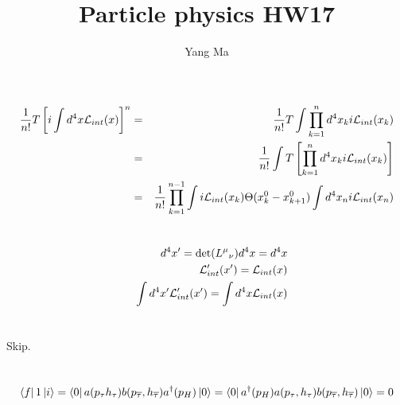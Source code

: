 \documentclass[11pt]{article}
\begin{document}
\title{Particle physics HW17}
\author{Yang Ma}

\maketitle

\section{ }
\begin{eqnarray}
    \frac{1}{n!}T\left[i\int d^4x {\cal L}_{int}(x)\right]^n & = &
    \frac{1}{n!} T \int \prod_{k=1}^n d^4x_k i {\cal L}_{int}(x_k)\\
    & =&\frac{1}{n!} \int T \left[\prod_{k=1}^{n}d^4x_k i{\cal L}_{int}(x_k)\right]\\
    & = &\frac{1}{n!}\prod_{k=1}^{n-1} \int i\mathcal{L}_{int} (x_k) \Theta(x_k^0 - x_{k+1}^0) \int d^4 x_n i\mathcal{L}_{int}(x_n)
\end{eqnarray}

\section{ }
\begin{eqnarray}
   && d^4x' =\det({L^\mu}_\nu) d^4x = d^4x\\
   && {\cal L}'_{int}(x') = {\cal L}_{int}(x)\\
   && \int d^4x' {\cal L}'_{int}(x') = \int d^4x {\cal L}_{int}(x)
\end{eqnarray}

\section{ }
Skip.
\section{ }
\begin{eqnarray}
\bra{f}1\ket{i}=\bra{0}a(p_\tau h_\tau) b(p_{\overline \tau},h_{\overline \tau})a^\dagger (p_H) \ket{0}=\bra{0}a^\dagger (p_H) a(p_\tau,h_\tau)b(p_{\overline \tau},h_{\overline \tau})\ket{0} =0
\end{eqnarray}
\end{document}
